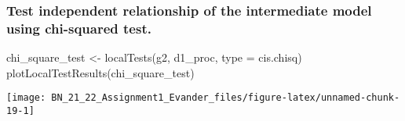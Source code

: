\documentclass[
]{article}
\newenvironment{Shaded}{\begin{snugshade}}{\end{snugshade}}
\newcommand{\AttributeTok}[1]{\textcolor[rgb]{0.77,0.63,0.00}{#1}}
\newcommand{\ConstantTok}[1]{\textcolor[rgb]{0.00,0.00,0.00}{#1}}
\newcommand{\DecValTok}[1]{\textcolor[rgb]{0.00,0.00,0.81}{#1}}
\newcommand{\FunctionTok}[1]{\textcolor[rgb]{0.00,0.00,0.00}{#1}}
\newcommand{\NormalTok}[1]{#1}
\newcommand{\OtherTok}[1]{\textcolor[rgb]{0.56,0.35,0.01}{#1}}
\newcommand{\SpecialCharTok}[1]{\textcolor[rgb]{0.00,0.00,0.00}{#1}}
\newcommand{\StringTok}[1]{\textcolor[rgb]{0.31,0.60,0.02}{#1}}
\begin{document}
\hypertarget{test-independent-relationship-of-the-intermediate-model-using-chi-squared-test.}{%
\subsubsection{Test independent relationship of the intermediate model
using chi-squared
test.}\label{test-independent-relationship-of-the-intermediate-model-using-chi-squared-test.}}

\begin{Shaded}
\begin{Highlighting}[]
\NormalTok{chi\_square\_test }\OtherTok{\textless{}{-}} \FunctionTok{localTests}\NormalTok{(g2, d1\_proc, }\AttributeTok{type =} \StringTok{\textquotesingle{}cis.chisq\textquotesingle{}}\NormalTok{)}
\FunctionTok{plotLocalTestResults}\NormalTok{(chi\_square\_test)}
\end{Highlighting}
\end{Shaded}

\begin{center}\texttt{[image: BN\_21\_22\_Assignment1\_Evander\_files/figure-latex/unnamed-chunk-19-1]} \end{center}

\begin{Shaded}
\end{Shaded}
\end{document}
